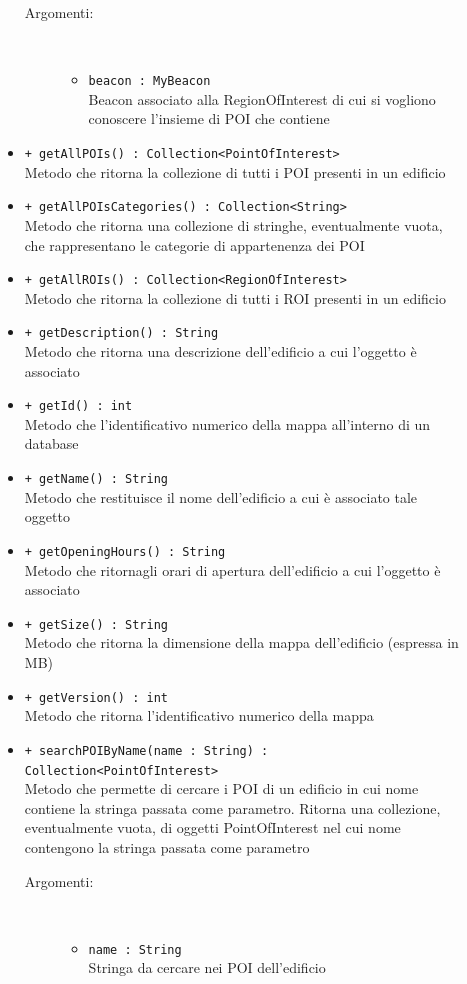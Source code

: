 \documentclass[../DefinizioneDiProdotto.tex]{subfiles}
\begin{document}
\begin{description}
\begin{itemize}
 \begin{description}
\item[Argomenti:] \
\begin{itemize}
\item \texttt{beacon : MyBeacon}\\
Beacon associato alla RegionOfInterest di cui si vogliono conoscere l'insieme di POI che contiene\end{itemize}
\end{description}
\item \texttt{+ getAllPOIs() : Collection<PointOfInterest>}\\
Metodo che ritorna la collezione di tutti i POI presenti in un edificio
 \item \texttt{+ getAllPOIsCategories() : Collection<String>}\\
Metodo che ritorna una collezione di stringhe, eventualmente vuota, che rappresentano le categorie di appartenenza dei POI
 \item \texttt{+ getAllROIs() : Collection<RegionOfInterest>}\\
Metodo che ritorna la collezione di tutti i ROI presenti in un edificio
 \item \texttt{+ getDescription() : String}\\
Metodo che ritorna una descrizione dell'edificio a cui l'oggetto è associato
 \item \texttt{+ getId() : int}\\
Metodo che l'identificativo numerico della mappa all'interno di un database
 \item \texttt{+ getName() : String}\\
Metodo che restituisce il nome dell'edificio a cui è associato tale oggetto
 \item \texttt{+ getOpeningHours() : String}\\
Metodo che ritornagli orari di apertura dell'edificio a cui l'oggetto è associato
 \item \texttt{+ getSize() : String}\\
Metodo che ritorna la dimensione della mappa dell'edificio (espressa in MB)
 \item \texttt{+ getVersion() : int}\\
Metodo che ritorna l'identificativo numerico della mappa
 \item \texttt{+ searchPOIByName(name : String) : Collection<PointOfInterest>}\\
Metodo che permette di cercare i POI di un edificio in cui nome contiene la stringa passata come parametro. Ritorna una collezione, eventualmente vuota,  di oggetti PointOfInterest nel cui nome contengono la stringa passata come parametro
 \begin{description}
\item[Argomenti:] \
\begin{itemize}
\item \texttt{name : String}\\
Stringa da cercare nei POI dell'edificio\end{itemize}
\end{description}
\end{itemize}
\end{description}
\end{document}
